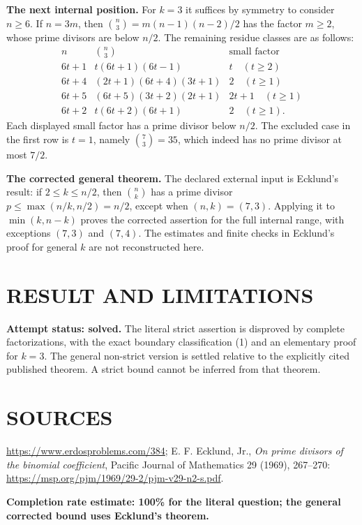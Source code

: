 \textbf{The next internal position.} For $k=3$ it suffices by symmetry to consider $n\geq6$. If $n=3m$, then
$\binom n3=m(n-1)(n-2)/2$ has the factor $m\geq2$, whose prime divisors are below $n/2$. The remaining residue classes are as follows:
\[
\begin{array}{c|c|c}
n&\binom n3&\text{small factor}\\\hline
6t+1&t(6t+1)(6t-1)&t\quad(t\geq2)\\
6t+4&(2t+1)(6t+4)(3t+1)&2\quad(t\geq1)\\
6t+5&(6t+5)(3t+2)(2t+1)&2t+1\quad(t\geq1)\\
6t+2&t(6t+2)(6t+1)&2\quad(t\geq1).
\end{array}
\]
Each displayed small factor has a prime divisor below $n/2$. The excluded case in the first row is $t=1$, namely $\binom73=35$, which indeed has no prime divisor at most $7/2$.

\textbf{The corrected general theorem.} The declared external input is Ecklund's result: if $2\leq k\leq n/2$, then $\binom nk$ has a prime divisor $p\leq\max(n/k,n/2)=n/2$, except when $(n,k)=(7,3)$. Applying it to $\min(k,n-k)$ proves the corrected assertion for the full internal range, with exceptions $(7,3)$ and $(7,4)$. The estimates and finite checks in Ecklund's proof for general $k$ are not reconstructed here.

\section{RESULT AND LIMITATIONS}
\textbf{Attempt status: solved.} The literal strict assertion is disproved by complete factorizations, with the exact boundary classification (1) and an elementary proof for $k=3$. The general non-strict version is settled relative to the explicitly cited published theorem. A strict bound cannot be inferred from that theorem.

\section{SOURCES}
\url{https://www.erdosproblems.com/384}; E. F. Ecklund, Jr., \emph{On prime divisors of the binomial coefficient}, Pacific Journal of Mathematics 29 (1969), 267--270: \url{https://msp.org/pjm/1969/29-2/pjm-v29-n2-s.pdf}.

\textbf{Completion rate estimate: 100\% for the literal question; the general corrected bound uses Ecklund's theorem.}
